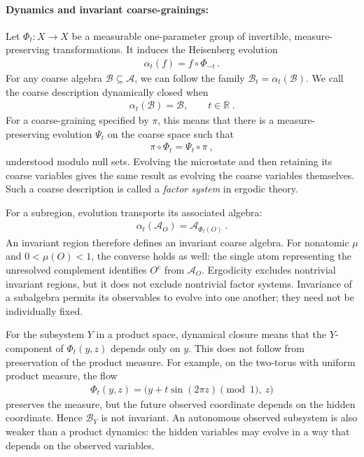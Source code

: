 \documentclass[a4paper,11pt]{article}
\theoremstyle{definition}
\newcommand{\mA}{\mathcal{A}}
\newcommand{\mB}{\mathcal{B}}
\begin{document}
\paragraph{Dynamics and invariant coarse-grainings:}
Let $\Phi_t:X\to X$ be a measurable one-parameter group of invertible, measure-preserving transformations. It induces the Heisenberg evolution
\begin{align}
    \alpha_t(f)=f\circ\Phi_{-t}\ .
\end{align}
For any coarse algebra $\mB\subseteq\mA$, we can follow the family $\mB_t=\alpha_t(\mB)$. We call the coarse description dynamically closed when
\begin{align}\label{eq:classical-coarse-invariance}
    \alpha_t(\mB)=\mB,\qquad t\in\mathbb R\ .
\end{align}
For a coarse-graining specified by $\pi$, this means that there is a measure-preserving evolution $\Psi_t$ on the coarse space such that
\begin{align}\label{eq:classical-factor-intertwining}
    \pi\circ\Phi_t=\Psi_t\circ\pi\ ,
\end{align}
understood modulo null sets. Evolving the microstate and then retaining its coarse variables gives the same result as evolving the coarse variables themselves. Such a coarse description is called a {\it factor system} in ergodic theory.

For a subregion, evolution transports its associated algebra:
\begin{align}
    \alpha_t(\mA_O)=\mA_{\Phi_t(O)}\ .
\end{align}
An invariant region therefore defines an invariant coarse algebra. For nonatomic $\mu$ and $0<\mu(O)<1$, the converse holds as well: the single atom representing the unresolved complement identifies $O^c$ from $\mA_O$. Ergodicity excludes nontrivial invariant regions, but it does not exclude nontrivial factor systems. Invariance of a subalgebra permits its observables to evolve into one another; they need not be individually fixed.

For the subsystem $Y$ in a product space, dynamical closure means that the $Y$-component of $\Phi_t(y,z)$ depends only on $y$. This does not follow from preservation of the product measure. For example, on the two-torus with uniform product measure, the flow
\begin{align}
    \Phi_t(y,z)=\bigl(y+t\sin(2\pi z)\!\!\pmod 1,\ z\bigr)
\end{align}
preserves the measure, but the future observed coordinate depends on the hidden coordinate. Hence $\mB_Y$ is not invariant. An autonomous observed subsystem is also weaker than a product dynamics: the hidden variables may evolve in a way that depends on the observed variables.
\end{document}
